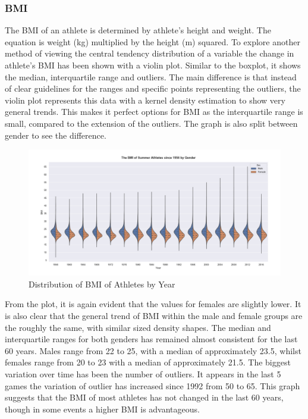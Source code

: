 \documentclass[a4 paper, 12pt]{article}
\begin{document}
        \subsubsection{BMI}
        The BMI of an athlete is determined by athlete's height and weight. The equation is weight (kg) multiplied by the height (m) squared. To explore another method of viewing the central tendency distribution of a variable the change in athlete's BMI has been shown with a violin plot. Similar to the boxplot, it shows the median, interquartile range and outliers. The main difference is that instead of clear guidelines for the ranges and specific points representing the outliers, the violin plot represents this data with a kernel density estimation to show very general trends. This makes it perfect options for BMI as the interquartile range is small, compared to the extension of the outliers. The graph is also split between gender to see the difference. 
        \begin{figure} [H]
            \centering
            \includegraphics[width=\textwidth, frame]
                {./images/graph/athlete_BMI_violinplot.png}      
                \caption{Distribution of BMI of Athletes by Year} 
        \end{figure}
        From the plot, it is again evident that the values for females are slightly lower. It is also clear that the general trend of BMI within the male and female groups are the roughly the same, with similar sized density shapes. The median and interquartile ranges for both genders has remained almost consistent for the last 60 years. Males range from 22 to 25, with a median of approximately 23.5, whilst females range from 20 to 23 with a median of approximately 21.5. The biggest variation over time has been the number of outliers. It appears in the last 5 games the variation of outlier has increased since 1992 from 50 to 65. This graph suggests that the BMI of most athletes has not changed in the last 60 years, though in some events a higher BMI is advantageous.
\end{document}
